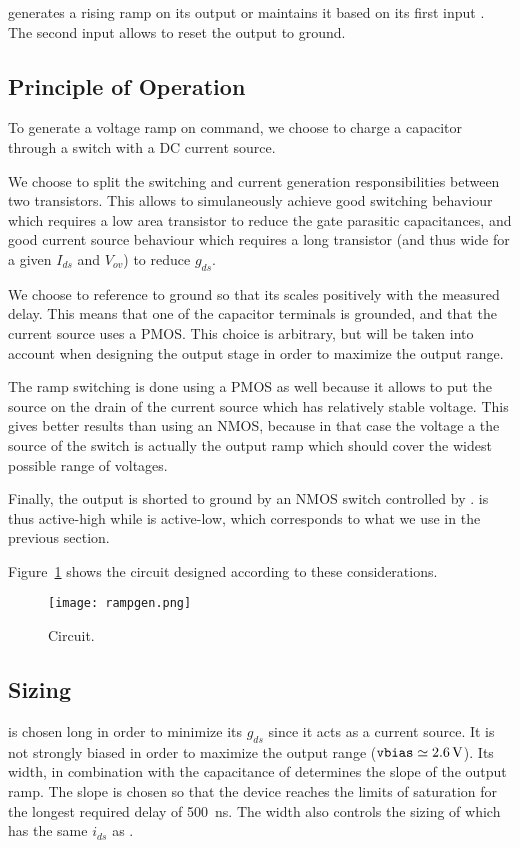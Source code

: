  generates a rising ramp on its output  or maintains it based on its first input . The second input  allows to reset the output to ground.

\subsection{Principle of Operation}
To generate a voltage ramp on command, we choose to charge a capacitor through a switch with a DC current source.

We choose to split the switching and current generation responsibilities between two transistors.
This allows to simulaneously achieve good switching behaviour which requires a low area transistor to reduce the gate parasitic capacitances, and good current source behaviour which requires a long transistor (and thus wide for a given $I_{ds}$ and $V_{ov}$) to reduce $g_{ds}$.

We choose to reference  to ground so that its scales positively with the measured delay.
This means that one of the capacitor terminals is grounded, and that the current source uses a PMOS.
This choice is arbitrary, but will be taken into account when designing the output stage in order to maximize the output range.

The ramp switching is done using a PMOS as well because it allows to put the source on the drain of the current source which has relatively stable voltage. This gives better results than using an NMOS, because in that case the voltage a the source of the switch is actually the output ramp which should cover the widest possible range of voltages.

Finally, the output is shorted to ground by an NMOS switch controlled by .  is thus active-high while  is active-low, which corresponds to what we use in the previous section.

Figure~\ref{fig:rampgen} shows the circuit designed according to these considerations.
\begin{figure}
  \centering
  \texttt{[image: rampgen.png]}
  \caption{ Circuit.\label{fig:rampgen}}
\end{figure}

\subsection{Sizing}\label{sub:rampsize}
 is chosen long in order to minimize its $g_{ds}$ since it acts as a current source.
It is not strongly biased in order to maximize the output range ($\mathtt{vbias} \simeq \SI{2.6}{\volt}$).
Its width, in combination with the capacitance of  determines the slope of the output ramp.
The slope is chosen so that the device reaches the limits of saturation for the longest required delay of \SI{500}{\nano\second}.
The width also controls the sizing of  which has the same $i_{ds}$ as .

